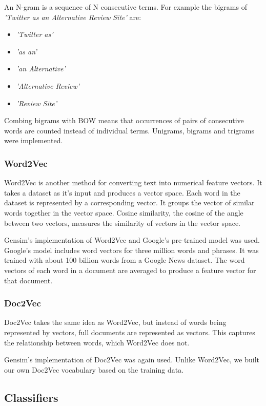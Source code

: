 An N-gram is a sequence of N consecutive terms. For example the bigrams of \emph{'Twitter as an Alternative Review Site'} are:
\begin{itemize}
    \item \emph{'Twitter as'}
    \item \emph{'as an'}
    \item \emph{'an Alternative'}
    \item \emph{'Alternative Review'}
    \item \emph{'Review Site'}
\end{itemize}

Combing bigrams with BOW means that occurrences of pairs of consecutive words are counted instead of individual terms. Unigrams, bigrams and trigrams were implemented.

\subsubsection{Word2Vec}

Word2Vec is another method for converting text into numerical feature vectors. It takes a dataset as it's input and produces a vector space. Each word in the dataset is represented by a corresponding vector. It groups the vector of similar words together in the vector space. Cosine similarity, the cosine of the angle between two vectors, measures the similarity of vectors in the vector space. 

Gensim's implementation of Word2Vec \cite{gensim} and Google's pre-trained model was used. Google's model includes word vectors for three million words and phrases. It was trained with about 100 billion words from a Google News dataset. The word vectors of each word in a document are averaged to produce a feature vector for that document.

\subsubsection*{Doc2Vec}

Doc2Vec takes the same idea as Word2Vec, but instead of words being represented by vectors, full documents are represented as vectors. This captures the relationship between words, which Word2Vec does not.

Gensim's implementation of Doc2Vec was again used. Unlike Word2Vec, we built our own Doc2Vec vocabulary based on the training data.

\subsection*{Classifiers}

